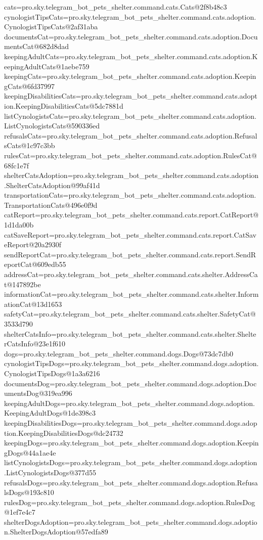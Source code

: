 cats=pro.sky.telegram_bot_pets_shelter.command.cats.Cats@2f8b48c3
cynologistTipsCats=pro.sky.telegram_bot_pets_shelter.command.cats.adoption.CynologistTipsCats@2af31aba
documentsCat=pro.sky.telegram_bot_pets_shelter.command.cats.adoption.DocumentsCat@682d8dad
keepingAdultCats=pro.sky.telegram_bot_pets_shelter.command.cats.adoption.KeepingAdultCats@1aebe759
keepingCats=pro.sky.telegram_bot_pets_shelter.command.cats.adoption.KeepingCats@6fd37997
keepingDisabilitiesCats=pro.sky.telegram_bot_pets_shelter.command.cats.adoption.KeepingDisabilitiesCats@5dc7881d
listCynologistsCats=pro.sky.telegram_bot_pets_shelter.command.cats.adoption.ListCynologistsCats@590336ed
refusalsCats=pro.sky.telegram_bot_pets_shelter.command.cats.adoption.RefusalsCats@1c97c3bb
rulesCat=pro.sky.telegram_bot_pets_shelter.command.cats.adoption.RulesCat@68fc1e7f
shelterCatsAdoption=pro.sky.telegram_bot_pets_shelter.command.cats.adoption.ShelterCatsAdoption@99af41d
transportationCats=pro.sky.telegram_bot_pets_shelter.command.cats.adoption.TransportationCats@496e0f9d
catReport=pro.sky.telegram_bot_pets_shelter.command.cats.report.CatReport@1d1da00b
catSaveReport=pro.sky.telegram_bot_pets_shelter.command.cats.report.CatSaveReport@20a2930f
sendReportCat=pro.sky.telegram_bot_pets_shelter.command.cats.report.SendReportCat@609edb55
addressCat=pro.sky.telegram_bot_pets_shelter.command.cats.shelter.AddressCat@147892be
informationCat=pro.sky.telegram_bot_pets_shelter.command.cats.shelter.InformationCat@13d1653
safetyCat=pro.sky.telegram_bot_pets_shelter.command.cats.shelter.SafetyCat@3533d790
shelterCatsInfo=pro.sky.telegram_bot_pets_shelter.command.cats.shelter.ShelterCatsInfo@23e1f610
dogs=pro.sky.telegram_bot_pets_shelter.command.dogs.Dogs@73dc7db0
cynologistTipsDogs=pro.sky.telegram_bot_pets_shelter.command.dogs.adoption.CynologistTipsDogs@1a3a6216
documentsDog=pro.sky.telegram_bot_pets_shelter.command.dogs.adoption.DocumentsDog@319ea996
keepingAdultDogs=pro.sky.telegram_bot_pets_shelter.command.dogs.adoption.KeepingAdultDogs@1de398c3
keepingDisabilitiesDogs=pro.sky.telegram_bot_pets_shelter.command.dogs.adoption.KeepingDisabilitiesDogs@dc24732
keepingDogs=pro.sky.telegram_bot_pets_shelter.command.dogs.adoption.KeepingDogs@44a1ae4e
listCynologistsDogs=pro.sky.telegram_bot_pets_shelter.command.dogs.adoption.ListCynologistsDogs@377d55
refusalsDogs=pro.sky.telegram_bot_pets_shelter.command.dogs.adoption.RefusalsDogs@193c810
rulesDog=pro.sky.telegram_bot_pets_shelter.command.dogs.adoption.RulesDog@1ef7e4c7
shelterDogsAdoption=pro.sky.telegram_bot_pets_shelter.command.dogs.adoption.ShelterDogsAdoption@57edfa89
